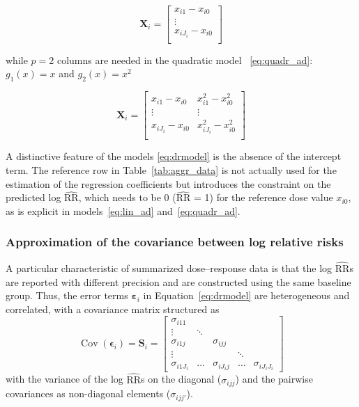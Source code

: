 \documentclass[11pt,a4paper,twoside,openany]{book}\usepackage{knitr}
\DeclareMathOperator{\Cov}{Cov}
\begin{document}
{{\begin{equation*}
 \mathbf{X}_i=\left[
\begin{array}{c}
x_{i1} - x_{i0} \\
\vdots \\
x_{iJ_i} - x_{i0} \\
\end{array}%
\right] 
\end{equation*}

\noindent while $p = 2$ columns are needed in the quadratic model ~\ref{eq:quadr_ad}: $g_1(x) = x$ and $g_2(x) = x^2$

\begin{equation*}
 \mathbf{X}_i=\left[
\begin{array}{cc}
x_{i1} - x_{i0} & x_{i1}^2 - x_{i0}^2 \\
\vdots & \vdots \\
x_{iJ_i} - x_{i0} & x_{iJ_i}^2 - x_{i0}^2 \\
\end{array}%
\right] 
\end{equation*}

\noindent A distinctive feature of the models \ref{eq:drmodel} is the absence of the intercept term. The reference row in Table~\ref{tab:aggr_data} is not actually used for the estimation of the regression coefficients but introduces the constraint on the predicted log $\widehat{\mathrm{RR}}$, which needs to be 0 ($\widehat{\mathrm{RR}}$ = 1) for the reference dose value $x_{i0}$, as is explicit in models~\ref{eq:lin_ad} and~\ref{eq:quadr_ad}.

\subsubsection*{Approximation of the covariance between log relative risks}\label{sec:cov}

\noindent A particular characteristic of summarized dose--response data is that the log $\widehat{\mathrm{RR}}$s are reported with different precision and are constructed using the same baseline group. Thus, the error terms $\boldsymbol{\varepsilon}_i$ in Equation~\ref{eq:drmodel} are heterogeneous and correlated, with a covariance matrix structured as
\begin{equation}
\Cov\left(\boldsymbol{\epsilon}_i\right) = \mathbf{S}_i = \left[
\begin{array}{ccccc}
\sigma_{i11} & \ \ & \ & & \ \\
\vdots \ & \ddots & & & \ \\
\sigma_{i1j}& \ & \sigma_{ijj}& & \ \\
\vdots & \ & \ & \ddots & \\
\sigma_{i1J_i} & \ldots & \sigma_{iJ_ij} & \ldots & \sigma_{iJ_iJ_i}
\end{array}
\right] 
\label{eq:S_i}
\end{equation}
\noindent with the variance of the log $\widehat{\mathrm{RR}}$s on the diagonal ($\sigma_{ijj}$) and the pairwise covariances as non-diagonal elements ($\sigma_{ijj'}$).

}}
\end{document}
